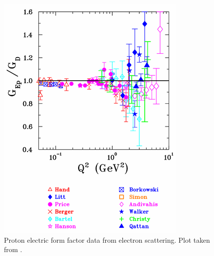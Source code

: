 \begin{figure}[ht]
\centering
\begin{minipage}{0.5\textwidth}
\centering
\includegraphics[width=0.9\linewidth]{Pictures/Gep.png}
\caption{Proton electric form factor data from electron scattering. Plot taken from \cite{Perdrisat}.}
\label{fig:Gep}
\end{minipage}%
\begin{minipage}{0.5\textwidth}
\centering

\end{minipage}
\end{figure}
